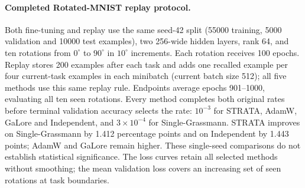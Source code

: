 \paragraph{Completed Rotated-MNIST replay protocol.} Both fine-tuning and replay use the same seed-42 split (55000 training, 5000 validation and 10000 test examples), two 256-wide hidden layers, rank 64, and ten rotations from $0^\circ$ to $90^\circ$ in $10^\circ$ increments. Each rotation receives 100 epochs. Replay stores 200 examples after each task and adds one recalled example per four current-task examples in each minibatch (current batch size 512); all five methods use this same replay rule. Endpoints average epochs 901--1000, evaluating all ten seen rotations. Every method completes both original rates before terminal validation accuracy selects the rate: $10^{-3}$ for STRATA, AdamW, GaLore and Independent, and $3\times10^{-4}$ for Single-Grassmann. STRATA improves on Single-Grassmann by 1.412 percentage points and on Independent by 1.443 points; AdamW and GaLore remain higher. These single-seed comparisons do not establish statistical significance. The loss curves retain all selected methods without smoothing; the mean validation loss covers an increasing set of seen rotations at task boundaries.
